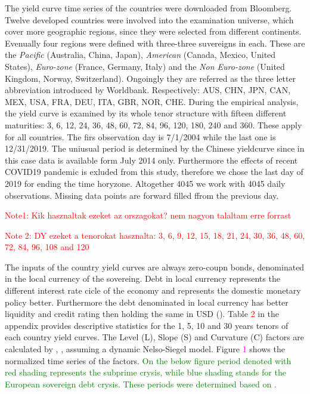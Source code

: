 \documentclass[12pt,bibliography=totoc]{article}
\begin{document}
The yield curve time series of the countries were downloaded from Bloomberg. Twelve developed countries were involved into the examination universe, which cover more geographic regions, since they were selected from different continents. Evenually four regions were defined with three-three suvereigns in each. These are the \textit{Pacific} (Australia, China, Japan), \textit{American} (Canada, Mexico, United States), \textit{Euro-zone} (France, Germany, Italy) and the \textit{Non Euro-zone} (United Kingdom, Norway, Switzerland). Ongoingly they are referred as the three letter abbreviation introduced by Worldbank. Respectively:  AUS, CHN, JPN, CAN, MEX, USA, FRA, DEU, ITA, GBR, NOR, CHE. During the empirical analysis, the yield curve is examined by its whole tenor structure with fifteen different maturities: 3, 6, 12, 24, 36, 48, 60, 72, 84, 96, 120, 180, 240 and 360. These apply for all countries. The firs observation day is 7/1/2004 while the last one is 12/31/2019. The uniusual period is determined by the Chinese yieldcurve since in this case data is available form July 2014 only. Furthermore the effects of recent COVID19 pandemic is exluded from this study, therefore we chose the last day of 2019 for ending the time horyzone. Altogether 4045 we work with 4045 daily observations. Missing data points are forward filled ffrom the previous day.

\textcolor{red}{Note1: Kik hasznaltak ezeket az orszagokat? nem nagyon talaltam erre forrast}

\textcolor{red}{Note 2: DY ezeket a tenorokat hasznalta: 3, 6, 9, 12, 15, 18, 21, 24, 30, 36, 48, 60, 72, 84, 96, 108 and 120}


The inputs of the country yield curves are always zero-coupn bonds, denominated in the local currency of the sovereing. Debt in local currency represents the different interest rate cicle of the economy and represents the domestic monetary policy better. Furthermore the debt denominated in local currency has better liquidity and credit rating then holding the same in USD  (\cite{sowmya2016linkages}). Table \textcolor{red}{2} in the appendix provides descriptive statistics for the 1, 5, 10 and 30 years tenors of each country yield curves. The Level (L), Slope (S) and Curvature (C) factors are calculated by \cite{diebold2006forecasting}, \cite{diebold2008global}, assuming a dynamic Nelso-Siegel model. Figure \textcolor{magenta}{1} shows the normalized time series of the factors.  \textcolor{green}{On the below figure period denoted with red shading represents the subprime crysis, while blue shading stands for the European sovereign debt crysis. These periods were determined based on \cite{bostanci2020connected}.}
\end{document}
